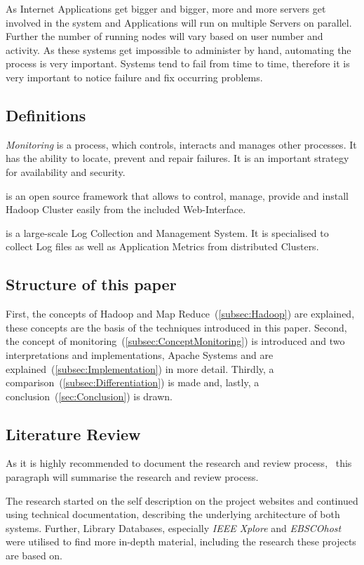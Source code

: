 As Internet Applications get bigger and bigger, more and more servers get involved in the system and Applications will run on multiple Servers on parallel. Further the number of running nodes will vary based on user number and activity. As these systems get impossible to administer by hand, automating the process is very important. Systems tend to fail from time to time, therefore it is very important to notice failure and fix occurring problems.


\subsection{Definitions}

\textit{Monitoring} is a process, which controls, interacts and manages other processes. It has the ability to locate, prevent and repair failures. It is an important strategy for availability and security.

\amb is an open source framework that allows to control, manage, provide and install Hadoop Cluster easily from the included Web-Interface.

\chuk is a large-scale Log Collection and Management System. It is specialised to collect Log files as well as Application Metrics from distributed Clusters.

\subsection{Structure of this paper}
First, the concepts of Hadoop and Map Reduce~(\ref{subsec:Hadoop}) are explained, these concepts are the basis of the techniques introduced in this paper. Second, the concept of monitoring~(\ref{subsec:ConceptMonitoring}) is introduced and two interpretations and implementations, Apache Systems \amb and \chuk are explained~(\ref{subsec:Implementation}) in more detail. Thirdly, a comparison~(\ref{subsec:Differentiation}) is made and, lastly, a conclusion~(\ref{sec:Conclusion}) is drawn.

\subsection{Literature Review}
	As it is highly recommended to document the research and review process,~\cite{brocke09} this paragraph will summarise the research and review process.
	
	The research started on the self description on the project websites and continued using technical documentation, describing the underlying architecture of both systems.
	Further, Library Databases, especially \emph{IEEE Xplore} and \emph{EBSCOhost} were utilised to find more in-depth material, including the research these projects are based on.
	
